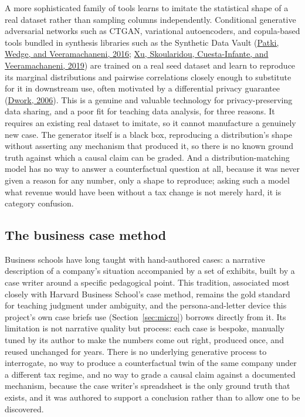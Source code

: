 \documentclass[12pt,a4paper]{article}
\begin{document}
A more sophisticated family of tools learns to imitate the statistical
shape of a real dataset rather than sampling columns independently.
Conditional generative adversarial networks such as CTGAN, variational
autoencoders, and copula-based tools bundled in synthesis libraries such
as the Synthetic Data Vault (\hyperlink{ref:patki2016}{Patki, Wedge, and
Veeramachaneni, 2016}; \hyperlink{ref:xu2019}{Xu, Skoularidou,
Cuesta-Infante, and Veeramachaneni, 2019}) are trained on a real seed
dataset and learn to reproduce its marginal distributions and pairwise
correlations closely enough to substitute for it in downstream use,
often motivated by a differential privacy guarantee
(\hyperlink{ref:dwork2006}{Dwork, 2006}). This is a genuine and valuable
technology for privacy-preserving data sharing, and a poor fit for
teaching data analysis, for three reasons. It requires an existing real
dataset to imitate, so it cannot manufacture a genuinely new case. The
generator itself is a black box, reproducing a distribution's shape
without asserting any mechanism that produced it, so there is no known
ground truth against which a causal claim can be graded. And a
distribution-matching model has no way to answer a counterfactual
question at all, because it was never given a reason for any number,
only a shape to reproduce; asking such a model what revenue would have
been without a tax change is not merely hard, it is category confusion.

\subsection{The business case method}

Business schools have long taught with hand-authored cases: a narrative
description of a company's situation accompanied by a set of exhibits,
built by a case writer around a specific pedagogical point. This
tradition, associated most closely with Harvard Business School's case
method, remains the gold standard for teaching judgment under ambiguity,
and the persona-and-letter device this project's own case briefs use
(Section~\ref{sec:micro}) borrows directly from it. Its limitation is not
narrative quality but process: each case is bespoke, manually tuned by
its author to make the numbers come out right, produced once, and reused
unchanged for years. There is no underlying generative process to
interrogate, no way to produce a counterfactual twin of the same company
under a different tax regime, and no way to grade a causal claim against
a documented mechanism, because the case writer's spreadsheet is the only
ground truth that exists, and it was authored to support a conclusion
rather than to allow one to be discovered.
\end{document}

